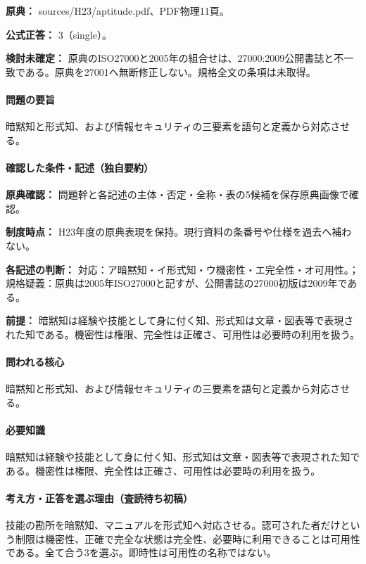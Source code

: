 \noindent\textbf{原典：} sources/H23/aptitude.pdf、PDF物理11頁。

\textbf{公式正答：} 3（single）。

\par\textbf{検討未確定：} 原典のISO27000と2005年の組合せは、27000:2009公開書誌と不一致である。原典を27001へ無断修正しない。規格全文の条項は未取得。

\paragraph{問題の要旨} 暗黙知と形式知、および情報セキュリティの三要素を語句と定義から対応させる。

\paragraph{確認した条件・記述（独自要約）}\mbox{}\par

\noindent\textbf{原典確認：} 問題幹と各記述の主体・否定・全称・表の5候補を保存原典画像で確認。\par

\noindent\textbf{制度時点：} H23年度の原典表現を保持。現行資料の条番号や仕様を過去へ補わない。\par

\noindent\textbf{各記述の判断：} 対応：ア暗黙知・イ形式知・ウ機密性・エ完全性・オ可用性。；規格疑義：原典は2005年ISO27000と記すが、公開書誌の27000初版は2009年である。\par

\noindent\textbf{前提：} 暗黙知は経験や技能として身に付く知、形式知は文章・図表等で表現された知である。機密性は権限、完全性は正確さ、可用性は必要時の利用を扱う。\par

\paragraph{問われる核心} 暗黙知と形式知、および情報セキュリティの三要素を語句と定義から対応させる。

\paragraph{必要知識} 暗黙知は経験や技能として身に付く知、形式知は文章・図表等で表現された知である。機密性は権限、完全性は正確さ、可用性は必要時の利用を扱う。

\paragraph{考え方・正答を選ぶ理由（査読待ち初稿）} 技能の勘所を暗黙知、マニュアルを形式知へ対応させる。認可された者だけという制限は機密性、正確で完全な状態は完全性、必要時に利用できることは可用性である。全て合う3を選ぶ。即時性は可用性の名称ではない。

